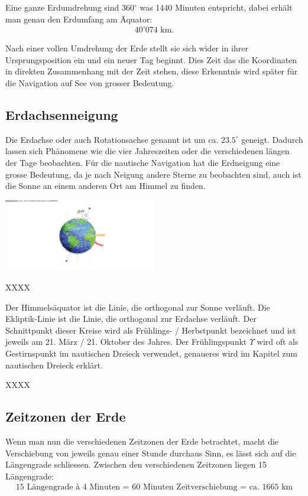 \begin{refsection}
\begin{refsection}
Eine ganze Erdumdrehung sind $360 ^{\circ}$ was 1440 Minuten entspricht, dabei erhält man genau den Erdumfang am Äquator:
\begin{align*} 40’074 \text{ km.}\end{align*}

Nach einer vollen Umdrehung der Erde stellt sie sich wider in ihrer Ursprungsposition ein und ein neuer Tag beginnt. Dies Zeit das die Koordinaten in direkten Zusammenhang mit der Zeit stehen, diese Erkenntnis wird später für die Navigation auf See von grosser Bedeutung.


\subsection{Erdachsenneigung}
Die Erdachse oder auch Rotationsachse genannt ist um ca. $23.5^{\circ}$ geneigt.
Dadurch lassen sich Phänomene wie die vier Jahreszeiten oder die verschiedenen längen der Tage beobachten.
Für die nautische Navigation hat die Erdneigung eine grosse Bedeutung, da je nach Neigung andere Sterne zu beobachten sind, auch ist die Sonne an einem anderen Ort am Himmel zu finden.

\begin{center}
        \includegraphics[width=0.5\textwidth]{kugel/1Ekliptik.jpg}
\end{center}


XXXX

Der Himmelsäquator ist die Linie, die orthogonal zur Sonne verläuft.
Die Ekliptik-Linie ist die Linie, die orthogonal zur Erdachse verläuft.
Der Schnittpunkt dieser Kreise wird als Frühlings- / Herbstpunkt bezeichnet und ist jeweils am 21. März / 21. Oktober des Jahres.
Der Frühlingspunkt $\Upsilon$ wird oft als Gestirnspunkt im nautischen Dreieck verwendet, genaueres wird im Kapitel zum nautischen Dreieck erklärt.


XXXX

\subsection{Zeitzonen der Erde} \label{Zeitzonen} 
Wenn man nun die verschiedenen Zeitzonen der Erde betrachtet, macht die Verschiebung von jeweils genau einer Stunde durchaus Sinn, es lässt sich auf die Längengrade schliessen.
Zwischen den verschiedenen Zeitzonen liegen 15 Längengrade:
\begin{align*}
\text{15 Längengrade à 4 Minuten = 60 Minuten Zeitverschiebung = ca. 1665 km}
\end{align*}


\end{refsection}
\end{refsection}
